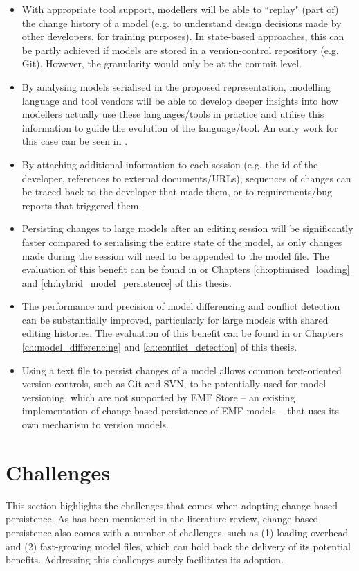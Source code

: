 \begin{itemize}
\item With appropriate tool support, modellers will be able to ``replay" (part of) the change history of a model (e.g. to understand design decisions made by other developers, for training purposes). In state-based approaches, this can be partly achieved if models are stored in a version-control repository (e.g. Git). However, the granularity would only be at the commit level.
\item By analysing models serialised in the proposed representation, modelling language and tool vendors will be able to develop deeper insights into how modellers actually use these languages/tools in practice and utilise this information to guide the evolution of the language/tool. An early work for this case can be seen in \cite{polack2019towards}.
\item By attaching additional information to each session (e.g. the id of the developer, references to external documents/URLs), sequences of changes can be traced back to the developer that made them, or to requirements/bug reports that triggered them.
\item Persisting changes to large models after an editing session will be significantly faster compared to serialising the entire state of the model, as only changes made during the session will need to be appended to the model file. The evaluation of this benefit can be found in \cite{yohannis2018towards,DBLP:conf/models/YohannisRPK18} or Chapters \ref{ch:optimised_loading} and \ref{ch:hybrid_model_persistence} of this thesis.
\item The performance and precision of model differencing and conflict detection can be substantially improved, particularly for large models with shared editing histories. The evaluation of this benefit can be found in \cite{yohannis2019efficient} or Chapters \ref{ch:model_differencing} and \ref{ch:conflict_detection} of this thesis.
\item Using a text file to persist changes of a model allows common text-oriented version controls, such as Git and SVN, to be potentially used for model versioning, which are not supported by EMF Store -- an existing implementation of change-based persistence of EMF models -- that uses its own mechanism to version models.
\end{itemize}

\section{Challenges}
\label{sec:challenges}
This section highlights the challenges that comes when adopting change-based persistence. As has been mentioned in the literature review, change-based persistence also comes with a number of challenges, such as (1) loading overhead and (2) fast-growing model files, which can hold back the delivery of its potential benefits. Addressing this challenges surely facilitates its adoption.

